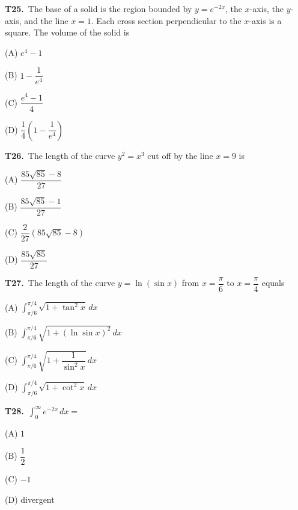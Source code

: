 \documentclass[11pt]{article}
\begin{document}
\bigskip\noindent\textbf{T25.}\ The base of a solid is the region bounded by $y=e^{-2x}$, the $x$-axis, the $y$-axis, and the line $x=1$. Each cross section perpendicular to the $x$-axis is a square. The volume of the solid is
\begin{list}{}{\setlength{\leftmargin}{3em}\setlength{\labelwidth}{2.5em}\setlength{\itemsep}{0pt}\setlength{\topsep}{2pt}}
\item[(A)] $e^4-1$
\item[(B)] $1-\dfrac{1}{e^4}$
\item[(C)] $\dfrac{e^4-1}{4}$
\item[(D)] $\dfrac{1}{4}\left(1-\dfrac{1}{e^4}\right)$
\end{list}

\bigskip\noindent\textbf{T26.}\ The length of the curve $y^2=x^3$ cut off by the line $x=9$ is
\begin{list}{}{\setlength{\leftmargin}{3em}\setlength{\labelwidth}{2.5em}\setlength{\itemsep}{0pt}\setlength{\topsep}{2pt}}
\item[(A)] $\dfrac{85\sqrt{85}-8}{27}$
\item[(B)] $\dfrac{85\sqrt{85}-1}{27}$
\item[(C)] $\dfrac{2}{27}(85\sqrt{85}-8)$
\item[(D)] $\dfrac{85\sqrt{85}}{27}$
\end{list}

\bigskip\noindent\textbf{T27.}\ The length of the curve $y=\ln(\sin x)$ from $x=\dfrac{\pi}{6}$ to $x=\dfrac{\pi}{4}$ equals
\begin{list}{}{\setlength{\leftmargin}{3em}\setlength{\labelwidth}{2.5em}\setlength{\itemsep}{0pt}\setlength{\topsep}{2pt}}
\item[(A)] $\displaystyle\int_{\pi/6}^{\pi/4} \sqrt{1+\tan^2 x}\,dx$
\item[(B)] $\displaystyle\int_{\pi/6}^{\pi/4} \sqrt{1+(\ln\sin x)^2}\,dx$
\item[(C)] $\displaystyle\int_{\pi/6}^{\pi/4} \sqrt{1+\dfrac{1}{\sin^2 x}}\,dx$
\item[(D)] $\displaystyle\int_{\pi/6}^{\pi/4} \sqrt{1+\cot^2 x}\,dx$
\end{list}

\bigskip\noindent\textbf{T28.}\ $\displaystyle\int_0^\infty e^{-2x}\,dx =$
\begin{list}{}{\setlength{\leftmargin}{3em}\setlength{\labelwidth}{2.5em}\setlength{\itemsep}{0pt}\setlength{\topsep}{2pt}}
\item[(A)] $1$
\item[(B)] $\dfrac{1}{2}$
\item[(C)] $-1$
\item[(D)] divergent
\end{list}
\end{document}
